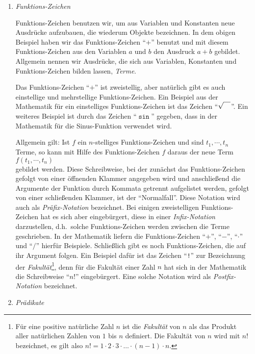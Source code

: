 \begin{enumerate}
\item \emph{Funktions-Zeichen}

      Funktions-Zeichen benutzen wir, um aus Variablen und Konstanten neue Ausdr\"{u}cke aufzubauen,
      die wiederum Objekte bezeichnen.  In dem obigen Beispiel haben wir das Funktions-Zeichen
      ``$+$'' benutzt und mit diesem Funktions-Zeichen aus den Variablen $a$ und $b$ den Ausdruck $a+b$
      gebildet.  Allgemein nennen wir Ausdr\"{u}cke, die sich aus Variablen, Konstanten und Funktions-Zeichen 
      bilden lassen, \emph{Terme}.  

      Das Funktions-Zeichen ``$+$'' ist zweistellig, aber nat\"{u}rlich gibt es auch einstellige und
      mehrstellige Funktions-Zeichen. Ein Beispiel aus der Mathematik f\"{u}r ein einstelliges Funktions-Zeichen ist 
      das Zeichen ``$\sqrt{\rule{0pt}{9pt}\quad}$''.  Ein weiteres Beispiel
      ist durch das Zeichen ``$\mathtt{\sin}$'' gegeben, dass in der Mathematik f\"{u}r die
      Sinus-Funktion verwendet wird.

      Allgemein gilt: Ist $f$ ein $n$-stelliges Funktions-Zeichen und sind 
       $t_1, \cdots, t_n$ Terme,
      so kann mit Hilfe des Funktions-Zeichen $f$  daraus der neue Term \\[0.2cm]
      \hspace*{1.3cm} $f(t_1,\cdots,t_n)$ \\[0.2cm]
      gebildet werden.  Diese Schreibweise, bei der zun\"{a}chst das Funktions-Zeichen
      gefolgt von einer \"{o}ffnenden Klammer angegeben wird und anschließend die Argumente
      der Funktion durch Kommata getrennt aufgelistet werden, gefolgt von einer
      schließenden Klammer, ist der ``Normalfall''.  Diese Notation wird auch als \emph{Pr\"{a}fix-Notation}
      bezeichnet. Bei einigen zweistelligen Funktions-Zeichen hat es sich aber eingeb\"{u}rgert, diese in einer
      \emph{Infix-Notation} darzustellen, d.h.~solche Funktions-Zeichen werden zwischen
      die Terme geschrieben. In der Mathematik liefern die  Funktions-Zeichen ``$+$'',
      ``$-$'', ``$\cdot $'' und ``$/$'' hierf\"{u}r Beispiele.  Schließlich gibt es noch Funktions-Zeichen,
      die auf ihr Argument folgen.  Ein Beispiel daf\"{u}r ist das Zeichen ``\texttt{!}'' zur
      Bezeichnung der \emph{Fakult\"{a}t}\footnote{
      F\"{u}r eine positive nat\"{u}rliche Zahl $n$ ist die \emph{Fakult\"{a}t} von $n$ als das Produkt aller
      nat\"{u}rlichen Zahlen von $1$ bis $n$ definiert.  Die Fakult\"{a}t von $n$ wird mit $n!$ bezeichnet, 
      es gilt also $n! = 1 \cdot 2 \cdot 3 \cdot \dots \cdot (n-1) \cdot n$.},
      denn f\"{u}r die Fakult\"{a}t einer Zahl $n$ hat sich in der Mathematik
      die Schreibweise ``$n!$'' eingeb\"{u}rgert.  Eine solche Notation wird als \emph{Postfix-Notation}
      bezeichnet.
\item \emph{Pr\"{a}dikate}


\end{enumerate}
